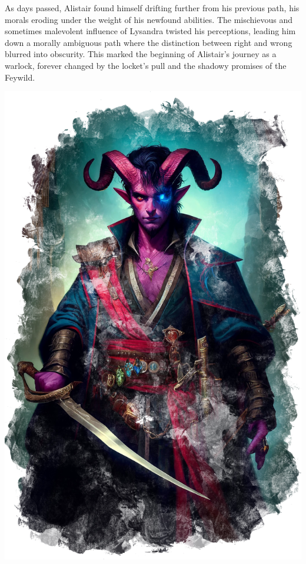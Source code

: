 \documentclass[letterpaper,openany,oneside,twocolumn]{book}
\begin{document}
As days passed, Alistair found himself drifting further from his previous path, his morals eroding under the weight of his newfound abilities. The mischievous and sometimes malevolent influence of Lysandra twisted his perceptions, leading him down a morally ambiguous path where the distinction between right and wrong blurred into obscurity. This marked the beginning of Alistair's journey as a warlock, forever changed by the locket's pull and the shadowy promises of the Feywild.
\vspace*{-1.8\fontdimen6\font}\begin{center}\includegraphics[scale=0.222]{images/Alistair_Warlock_Appearance.png}\end{center}\vspace*{-4.8\fontdimen6\font}\hfill\\
\end{document}

